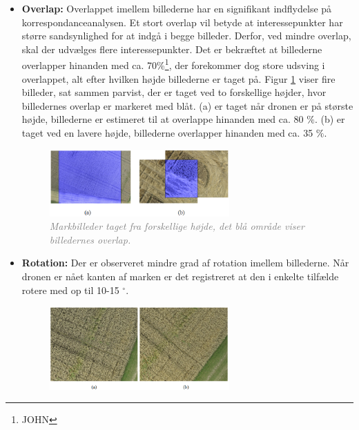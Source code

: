 \begin{itemize}
\item{\textbf{Overlap:} Overlappet imellem billederne har en signifikant indflydelse på korrespondanceanalysen. Et stort overlap vil betyde at interessepunkter har større sandsynlighed for at indgå i begge billeder. Derfor, ved mindre overlap, skal der udvælges flere interessepunkter. Det er bekræftet at billederne overlapper hinanden med ca. 70\%\footnote{JOHN}, der forekommer dog store udsving i overlappet, alt efter hvilken højde billederne er taget på. Figur \ref{fig:overlap} viser fire billeder, sat sammen parvist, der er taget ved to forskellige højder, hvor billedernes overlap er markeret med blåt. (a) er taget når dronen er på største højde, billederne er estimeret til at overlappe hinanden med ca. 80 $\%$. (b) er taget ved en lavere højde, billederne overlapper hinanden med ca. 35 $\%$.
\begin{figure}[H]
    \centering
    \includegraphics[width=0.65\textwidth]{fig/17.png}
     \vspace{-1em}
    \begin{center}    
       \caption{\textcolor{gray}{\footnotesize \textit{Markbilleder taget fra forskellige højde, det blå område viser billedernes overlap.}}}
    \label{fig:overlap}
     \end{center}
     \vspace{-2.5em}
  \end{figure} \noindent }
\item{\textbf{Rotation:} Der er observeret mindre grad af rotation imellem billederne. Når dronen er nået kanten af marken er det registreret at den i enkelte tilfælde rotere med op til 10-15 $^{\circ}$.
\begin{figure}[H]
    \centering
    \includegraphics[width=0.65\textwidth]{fig/19.png}

\end{figure}}
\end{itemize}
